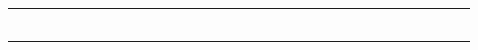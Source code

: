\documentclass[10pt]{article}
\begin{document}
\begin{center}
\begin{tabular}{|c|c|c|c|c|c|c|c|c|c|c|c|c|c|c|c|c|c|c|c|c|c|c|c|c|c|c|c|c|c|c|c|c|}
\hline
 &  &  &  &  &  &  &  &  &  &  &  &  &  &  &  &  &  &  &  &  &  &  &  &  &  &  &  &  &  &  &  &  \\
\hline
 &  &  &  &  &  &  &  &  &  &  &  &  &  &  &  &  &  &  &  &  &  &  &  &  &  &  &  &  &  &  &  &  \\
\hline
 &  &  &  &  &  &  &  &  &  &  &  &  &  &  &  &  &  &  &  &  &  &  &  &  &  &  &  &  &  &  &  &  \\
\hline
 &  &  &  &  &  &  &  &  &  &  &  &  &  &  &  &  &  &  &  &  &  &  &  &  &  &  &  &  &  &  &  &  \\
\hline
 &  &  &  &  &  &  &  &  &  &  &  &  &  &  &  &  &  &  &  &  &  &  &  &  &  &  &  &  &  &  &  &  \\
\hline
 &  &  &  &  &  &  &  &  &  &  &  &  &  &  &  &  &  &  &  &  &  &  &  &  &  &  &  &  &  &  &  &  \\
\hline
 &  &  &  &  &  &  &  &  &  &  &  &  &  &  &  &  &  &  &  &  &  &  &  &  &  &  &  &  &  &  &  &  \\
\hline

\end{tabular}
\end{center}
\end{document}
